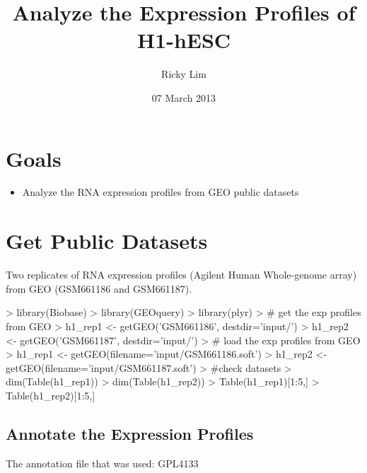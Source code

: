 \documentclass{article}
\begin{document}
\title{Analyze the Expression Profiles of H1-hESC}
\author{Ricky Lim}
\date{07 March 2013}
\maketitle

\section{Goals}
\begin{itemize}
  \item Analyze the RNA expression profiles from GEO public datasets
\end{itemize}

\section{Get Public Datasets}
Two replicates of RNA expression profiles (Agilent Human Whole-genome array) from GEO (GSM661186 and GSM661187).

\begin{Schunk}
\begin{Sinput}
> library(Biobase)
> library(GEOquery)
> library(plyr)
> # get the exp profiles from GEO
> h1_rep1 <- getGEO('GSM661186', destdir='input/')
> h1_rep2 <- getGEO('GSM661187', destdir='input/')
> # load the exp profiles from GEO
> h1_rep1 <- getGEO(filename='input/GSM661186.soft')
> h1_rep2 <- getGEO(filename='input/GSM661187.soft')
> #check datasets
> dim(Table(h1_rep1))
> dim(Table(h1_rep2))
> Table(h1_rep1)[1:5,]
> Table(h1_rep2)[1:5,]
\end{Sinput}
\end{Schunk}

\subsection{Annotate the Expression Profiles}
The annotation file that was used: GPL4133
\begin{Schunk}
\end{Schunk}
\end{document}
